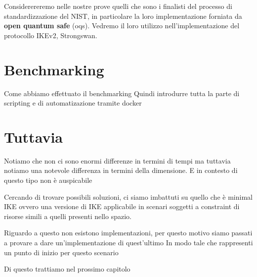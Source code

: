 Considerereremo nelle nostre prove quelli che sono i finalisti del processo di standardizzazione del NIST, in particolare la loro implementazione
forniata da \textbf{open quantum safe} (oqs). Vedremo il loro utilizzo nell'implementazione del protocollo IKEv2, Strongswan.

\section{Benchmarking}
Come abbiamo effettuato il benchmarking
Quindi introdurre tutta la parte di scripting e di automatizazione tramite docker

\section{Tuttavia}

Notiamo che non ci sono enormi differenze in termini di tempi ma tuttavia notiamo una notevole differenza
in termini della dimensione. E in contesto di questo tipo non è auspicabile

Cercando di trovare possibili soluzioni, ci siamo imbattuti su quello che è minimal IKE ovvero
una versione di IKE applicabile in scenari soggetti a constraint di risorse simili a quelli presenti nello spazio.

Riguardo a questo non esistono implementazioni, per questo motivo siamo passati a provare a dare un'implementazione di quest'ultimo
In modo tale che rappresenti un punto di inizio per questo scenario

Di questo trattiamo nel prossimo capitolo



